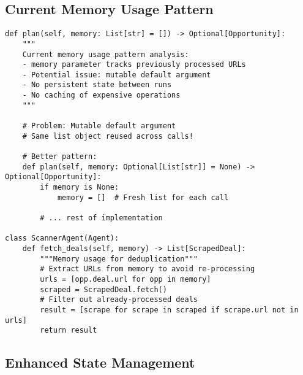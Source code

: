 \subsection{Current Memory Usage Pattern}

\begin{lstlisting}[caption=Memory Management in Current System]
def plan(self, memory: List[str] = []) -> Optional[Opportunity]:
    """
    Current memory usage pattern analysis:
    - memory parameter tracks previously processed URLs
    - Potential issue: mutable default argument
    - No persistent state between runs
    - No caching of expensive operations
    """
    
    # Problem: Mutable default argument
    # Same list object reused across calls!
    
    # Better pattern:
    def plan(self, memory: Optional[List[str]] = None) -> Optional[Opportunity]:
        if memory is None:
            memory = []  # Fresh list for each call
        
        # ... rest of implementation

class ScannerAgent(Agent):
    def fetch_deals(self, memory) -> List[ScrapedDeal]:
        """Memory usage for deduplication"""
        # Extract URLs from memory to avoid re-processing
        urls = [opp.deal.url for opp in memory]
        scraped = ScrapedDeal.fetch()
        # Filter out already-processed deals
        result = [scrape for scrape in scraped if scrape.url not in urls]
        return result
\end{lstlisting}

\subsection{Enhanced State Management}


